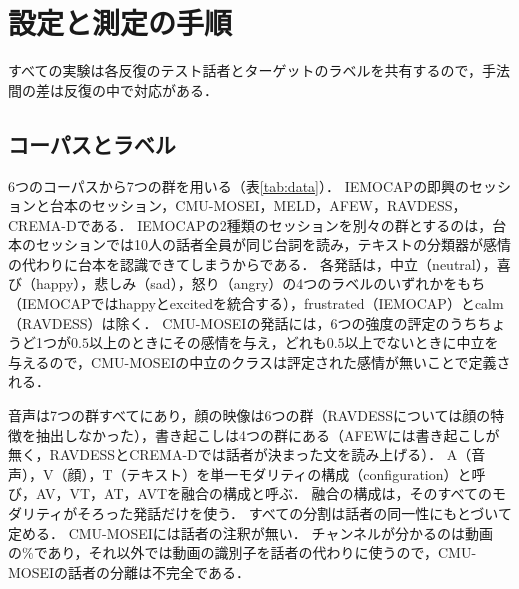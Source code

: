 \section{設定と測定の手順}
\label{sec:setting}

すべての実験は各反復のテスト話者とターゲットのラベルを共有するので，手法間の差は反復の中で対応がある．

\subsection{コーパスとラベル}
\label{sec:setting-data}

6つのコーパスから7つの群を用いる（表\ref{tab:data}）．
IEMOCAP\cite{busso2008iemocap}の即興のセッションと台本のセッション，CMU-MOSEI\cite{zadeh2018mosei}，MELD\cite{poria2019meld}，AFEW\cite{dhall2012afew}，RAVDESS\cite{livingstone2018ravdess}，CREMA-D\cite{cao2014cremad}である．
IEMOCAPの2種類のセッションを別々の群とするのは，台本のセッションでは10人の話者全員が同じ台詞を読み，テキストの分類器が感情の代わりに台本を認識できてしまうからである．
各発話は，中立（neutral），喜び（happy），悲しみ（sad），怒り（angry）の4つのラベルのいずれかをもち（IEMOCAPではhappyとexcitedを統合する），frustrated（IEMOCAP）とcalm（RAVDESS）は除く．
CMU-MOSEIの発話には，6つの強度の評定のうちちょうど1つが$0.5$以上のときにその感情を与え，どれも$0.5$以上でないときに中立を与えるので，CMU-MOSEIの中立のクラスは評定された感情が無いことで定義される．

音声は7つの群すべてにあり，顔の映像は6つの群（RAVDESSについては顔の特徴を抽出しなかった），書き起こしは4つの群にある（AFEWには書き起こしが無く，RAVDESSとCREMA-Dでは話者が決まった文を読み上げる）．
A（音声），V（顔），T（テキスト）を単一モダリティの構成（configuration）と呼び，AV，VT，AT，AVTを融合の構成と呼ぶ．
融合の構成は，そのすべてのモダリティがそろった発話だけを使う．
すべての分割は話者の同一性にもとづいて定める．
CMU-MOSEIには話者の注釈が無い．
チャンネルが分かるのは動画の\%であり，それ以外では動画の識別子を話者の代わりに使うので，CMU-MOSEIの話者の分離は不完全である．

